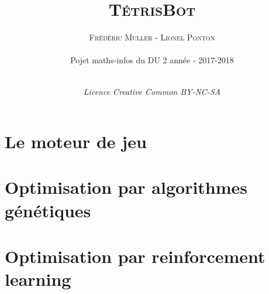 


\lfoot[\thepage]{}
\rfoot[]{\thepage}


\renewcommand{\encadre}[1]{
	\begin{center}
		\fbox{\parbox{0.9\linewidth}{
				\medskip
				
				#1
				
				\medskip
		}}
	\end{center}	
}	





\title{\Huge{\textsc{TétrisBot}}}
\author{\textsc{Frédéric Muller - Lionel Ponton}\\ \ \\ \small{Pojet maths-infos du DU 2 année - 2017-2018}\\ \ \\}


\date{\vfill \textit{Licence Creative Common BY-NC-SA}}
\maketitle


\clearpage{\pagestyle{empty}\cleardoublepage}



\setcounter{tocdepth}{1}
\tableofcontents
\thispagestyle{fancy}


\part{Le moteur de jeu}




\part{Optimisation par algorithmes génétiques}


\part{Optimisation par reinforcement learning}






